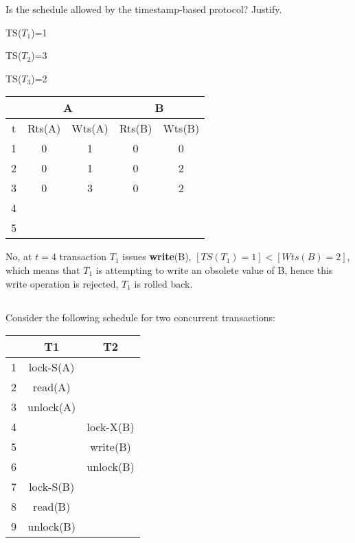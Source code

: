 {\color{gray}Is the schedule allowed by the timestamp-based protocol? Justify.}

TS($T_1$)=1

TS($T_2$)=3

TS($T_3$)=2

\begin{table}[h]
\centering
\begin{tabular}{c|c|c|c|c|}
\cline{2-5}
                        & \multicolumn{2}{c|}{A} & \multicolumn{2}{c|}{B} \\ \hline
\multicolumn{1}{|c|}{t} & Rts(A)    & Wts(A)   & Rts(B)    & Wts(B)   \\ \hline
\multicolumn{1}{|c|}{1} & 0          & 1         & 0          & 0         \\ \hline
\multicolumn{1}{|c|}{2} & 0          & 1         & 0          & 2         \\ \hline
\multicolumn{1}{|c|}{3} & 0          & 3         & 0          & 2         \\ \hline
\multicolumn{1}{|c|}{4} &            &           &            &           \\ \hline
\multicolumn{1}{|c|}{5} &            &           &            &           \\ \hline
\end{tabular}
\end{table}

No, at $t=4$ transaction $T_1$ issues \textbf{write}(B), $[ TS(T_1)=1 ] < [ Wts(B) = 2 ]$, which means that $T_1$ is attempting to write an obsolete value of B, hence this write operation is rejected, $T_1$ is rolled back. 


\subsection{}
{\color{gray}Consider the following schedule for two concurrent transactions:}

\begin{table}[h]
\centering
{\color{gray}
\begin{tabular}{|c|c|c|}
\hline
  & T1        & T2        \\ \hline
1 & lock-S(A) &           \\ \hline
2 & read(A)   &           \\ \hline
3 & unlock(A) &           \\ \hline
4 &           & lock-X(B) \\ \hline
5 &           & write(B)  \\ \hline
6 &           & unlock(B) \\ \hline
7 & lock-S(B) &           \\ \hline
8 & read(B)   &           \\ \hline
9 & unlock(B) &           \\ \hline
\end{tabular}
}
\end{table}

